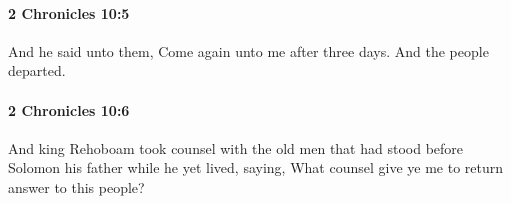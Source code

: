 		\paragraph{2 Chronicles 10:5} %
			\label{2CHRONICLES-10-5}

			And he said unto them, Come again unto me after three days. And the people departed.


		\paragraph{2 Chronicles 10:6} %
			\label{2CHRONICLES-10-6}

			And king Rehoboam took counsel with the old men that had stood before Solomon his father while he yet lived, saying, What counsel give ye me to return answer to this people?


